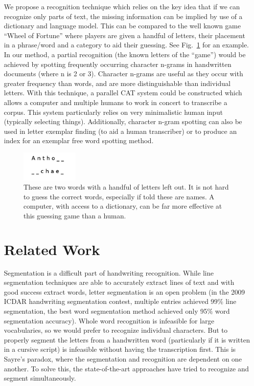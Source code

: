 \documentclass[ms]{byuprop}
\begin{document}
We propose a recognition technique which relies on the key idea that if we can recognize only parts of text, the missing information can be implied by use of a dictionary and language model. This can be compared to the well known game ``Wheel of Fortune'' where players are given a handful of letters, their placement in a phrase/word and a category to aid their guessing. See Fig.~\ref{fig:wheel_of_fortune_example} for an example. In our method, a partial recognition (the known letters of the ``game'') would be achieved by spotting frequently occurring character n-grams in handwritten documents (where n is 2 or 3). Character n-grams are useful as they occur with greater frequency than words, and are more distinguishable than individual letters. With this technique, a parallel CAT system could be constructed which allows a computer and multiple humans to work in concert to transcribe a corpus. This system particularly relies on very minimalistic human input (typically selecting things). Additionally, character n-gram spotting can also be used in letter exemplar finding (to aid a human transcriber) or to produce an index for an exemplar free word spotting method.

\begin{figure}[h]
    \centering
    \includegraphics[width=0.25\textwidth]{wheel_of_fortune_example}
    \caption{These are two words with a handful of letters left out. It is not hard to guess the correct words, especially if told these are names. A computer, with access to a dictionary, can be far more effective at this guessing game than a human.}
    \label{fig:wheel_of_fortune_example}
\end{figure}


\section{Related Work}

Segmentation is a difficult part of handwriting recognition. While line segmentation techniques are able to accurately extract lines of text and with good success extract words, letter segmentation is an open problem (in the 2009 ICDAR handwriting segmentation contest, multiple entries achieved 99\% line segmentation, the best word segmentation method achieved only 95\% word segmentation accuracy\cite{icdar_segmentation}). Whole word recognition is infeasible for large vocabularies, so we would prefer to recognize individual characters. But to properly segment the letters from a handwritten word (particularly if it is written in a cursive script) is infeasible without having the transcription first. This is Sayre's paradox, where the segmentation and recognition are dependent on one another.\cite{sayres} To solve this, the state-of-the-art approaches have tried to recognize and segment simultaneously.
\end{document}
